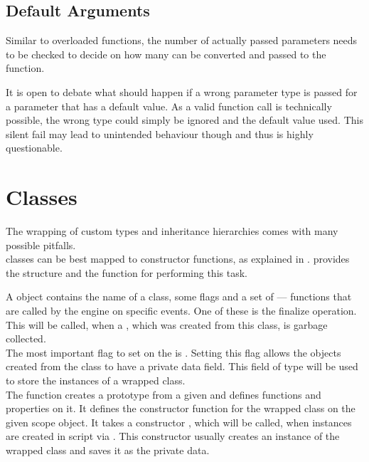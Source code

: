 \subsection{Default Arguments}

Similar to overloaded functions, the number of actually passed parameters needs to be checked to decide on how many can be converted and passed to the  function.

It is open to debate what should happen if a wrong parameter type is passed for a parameter that has a default value. As a valid function call is technically possible, the wrong type could simply be ignored and the default value used. This silent fail may lead to unintended behaviour though and thus is highly questionable.

\section{Classes}
\label{sec:StructsAndClasses}

The wrapping of custom types and inheritance hierarchies comes with many possible pitfalls.\\
 classes can be best mapped to  constructor functions, as explained in .  provides the structure  and the function  for performing this task.

A  object contains the name of a class, some flags and a set of \linebreak{} --- functions that are called by the  engine on specific events. One of these  is the finalize operation. This will be called, when a , which was created from this class, is garbage collected.\\
The most important flag to set on the  is . Setting this flag allows the objects created from the class to have a private data field. This field of type  will be used to store the instances of a wrapped  class.\\
The function  creates a prototype  from a given  and defines functions and properties on it. It defines the  constructor function for the wrapped class on the given scope object. It takes a constructor , which will be called, when instances are created in script via . This constructor usually creates an instance of the wrapped  class and saves it as the private data.

